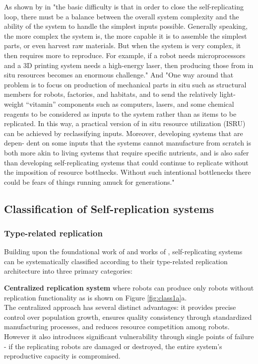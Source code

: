 As shown by \citeauthor{Chirikjian2022Entropy} in  \cite{Chirikjian2022Entropy}
"the basic difficulty is that in order to close the self-replicating loop, there
must be a balance between the overall system complexity and the ability of the
system to handle the simplest inputs possible. Generally speaking, the more
complex the system is, the more capable it is to assemble the simplest parts,
or even harvest raw materials. But when the system is very complex, it then
requires more to reproduce. For example, if a robot needs microprocessors and
a 3D printing system needs a high-energy laser, then producing those from in
situ resources becomes an enormous challenge."
And "One way around that problem is to focus on production of mechanical parts in situ such as structural members 
for robots, factories, and habitats, and to send the relatively light-weight
“vitamin” components such as computers, lasers, and some chemical reagents 
to be considered as inputs to the system rather than as items to be replicated.
In this way, a practical version of in situ resource utilization (ISRU) can be
achieved by reclassifying inputs. Moreover, developing systems that are depen-
dent on some inputs that the systems cannot manufacture from scratch is both
more akin to living systems that require specific nutrients, and is also safer than
developing self-replicating systems that could continue to replicate without the
imposition of resource bottlnecks. Without such intentional bottlenecks there
could be fears of things running amuck for generations."



\subsection{Classification of Self-replication systems}
\label{ch:SRRSclassification}
 
\subsubsection{Type-related replication} 
Building upon the foundational work of \citeauthor{Jones2021Thesis} \cite{Jones2021Thesis} and  
works of \citeauthor{Lee2007Robotic} , 
self-replicating systems can be 
systematically classified according to their type-related replication architecture into three primary categories:

\textbf{Centralized replication system } where robots can produce only robots 
without replication functionality  as is shown on Figure \ref{fig:class1a}a.\\
The centralized approach has several distinct advantages: it provides precise control 
over population growth, ensures quality consistency through standardized 
manufacturing processes, and reduces resource competition among robots.
However it also introduces significant vulnerability through single 
points of failure - if the replicating robots are damaged or destroyed, 
the entire system's reproductive capacity is compromised. 

